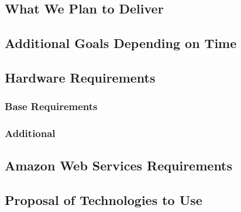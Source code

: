 \documentclass{article}
\begin{document}
	\subsection{What We Plan to Deliver}
	\subsection{Additional Goals Depending on Time}
	\subsection{Hardware Requirements}
		\subsubsection{Base Requirements}
		\subsubsection{Additional}
	\subsection{Amazon Web Services Requirements}
	\subsection{Proposal of Technologies to Use}
\end{document}
